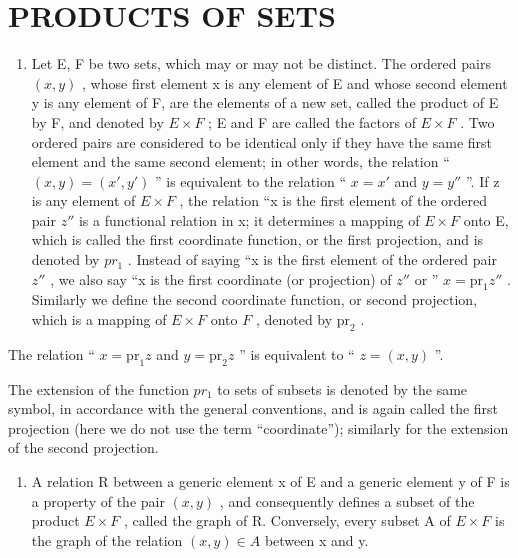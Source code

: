 \section{PRODUCTS OF SETS}

\begin{enumerate}
\def\labelenumi{\arabic{enumi}.}
\tightlist
\item
  Let E, F be two sets, which may or may not be distinct. The ordered pairs \((x, y)\) , whose first element x is any element of E and whose second element y is any element of F, are the elements of a new set, called the product of E by F, and denoted by \(E \times F\) ; E and F are called the factors of \(E \times F\) . Two ordered pairs are considered to be identical only if they have the same first element and the same second element; in other words, the relation `` \((x, y) = (x', y')\) '' is equivalent to the relation `` \(x = x'\) and \(y = y''\) ''. If z is any element of \(E \times F\) , the relation ``x is the first element of the ordered pair \(z''\) is a functional relation in x; it determines a mapping of \(E \times F\) onto E, which is called the first coordinate function, or the first projection, and is denoted by \(pr_{1}\) . Instead of saying ``x is the first element of the ordered pair \(z''\) , we also say ``x is the first coordinate (or projection) of \(z''\) or '' \(x = \mathrm{pr}_1z''\) . Similarly we define the second coordinate function, or second projection, which is a mapping of \(E \times F\) onto \(F\) , denoted by \(\mathrm{pr}_2\) .
\end{enumerate}

The relation `` \(x = \text{pr}_1 z\) and \(y = \text{pr}_2 z\) '' is equivalent to `` \(z = (x, y)\) ''.

The extension of the function \(pr_{1}\) to sets of subsets is denoted by the same symbol, in accordance with the general conventions, and is again called the first projection (here we do not use the term ``coordinate''); similarly for the extension of the second projection.

\begin{enumerate}
\def\labelenumi{\arabic{enumi}.}
\setcounter{enumi}{1}
\tightlist
\item
  A relation R between a generic element x of E and a generic element y of F is a property of the pair \((x, y)\) , and consequently defines a subset of the product \(E \times F\) , called the graph of R. Conversely, every subset A of \(E \times F\) is the graph of the relation \((x, y) \in A\) between x and y.
\end{enumerate}

